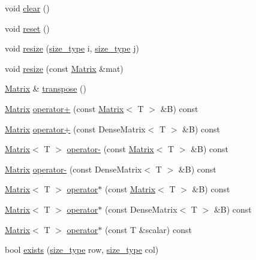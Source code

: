 \begin{DoxyCompactItemize}
\item 
void \hyperlink{classMatrix_ad39022f082bfee09e24d098796e14e10}{clear} ()
\item 
void \hyperlink{classMatrix_af40e280112b61f6a37b54d2e5ef02e5b}{reset} ()
\item 
void \hyperlink{classMatrix_a2a591b90d5553c7d097cb27f8d8ce29a}{resize} (\hyperlink{lmx__mat__data_8h_a49b489a408a211a90e766329c0732d7b}{size\-\_\-type} i, \hyperlink{lmx__mat__data_8h_a49b489a408a211a90e766329c0732d7b}{size\-\_\-type} j)
\item 
void \hyperlink{classMatrix_af21f3044dc958a53f9f22f40b70a1ad1}{resize} (const \hyperlink{classMatrix}{Matrix} \&mat)
\item 
\hyperlink{classMatrix}{Matrix} \& \hyperlink{classMatrix_accfd52f77ce100b5ffa35a434eec4eb1}{transpose} ()
\item 
\hyperlink{classMatrix}{Matrix} \hyperlink{classMatrix_a4d2d081f23b22321941c9584b89e0cf3}{operator+} (const \hyperlink{classMatrix}{Matrix}$<$ T $>$ \&B) const 
\item 
\hyperlink{classMatrix}{Matrix} \hyperlink{classMatrix_aae75f71f4a42101b068fc6ae023c3ac4}{operator+} (const Dense\-Matrix$<$ T $>$ \&B) const 
\item 
\hyperlink{classMatrix}{Matrix}$<$ T $>$ \hyperlink{classMatrix_a6e7f2dccf069eb1df036ad7ff3756789}{operator-\/} (const \hyperlink{classMatrix}{Matrix}$<$ T $>$ \&B) const 
\item 
\hyperlink{classMatrix}{Matrix} \hyperlink{classMatrix_adb6f17017ec3598c84d933e5ee762b90}{operator-\/} (const Dense\-Matrix$<$ T $>$ \&B) const 
\item 
\hyperlink{classMatrix}{Matrix}$<$ T $>$ \hyperlink{classMatrix_a24d516d845a1b9ba87706566e5604588}{operator$\ast$} (const \hyperlink{classMatrix}{Matrix}$<$ T $>$ \&B) const 
\item 
\hyperlink{classMatrix}{Matrix}$<$ T $>$ \hyperlink{classMatrix_a08bd824b1d3e5b02ffcabf2d70f518d5}{operator$\ast$} (const Dense\-Matrix$<$ T $>$ \&B) const 
\item 
\hyperlink{classMatrix}{Matrix}$<$ T $>$ \hyperlink{classMatrix_a48967ad505c540147f116fa0b3050bac}{operator$\ast$} (const T \&scalar) const 
\item 
bool \hyperlink{classMatrix_a5ac0a39b36bc04e4cedfde09dfe01105}{exists} (\hyperlink{lmx__mat__data_8h_a49b489a408a211a90e766329c0732d7b}{size\-\_\-type} row, \hyperlink{lmx__mat__data_8h_a49b489a408a211a90e766329c0732d7b}{size\-\_\-type} col)
\item 

\end{DoxyCompactItemize}
